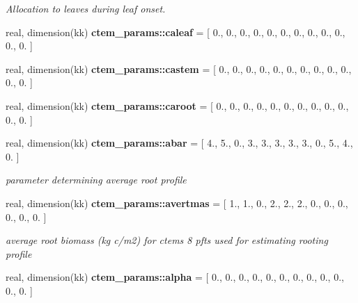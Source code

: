 \begin{DoxyCompactItemize}
\begin{DoxyCompactList}\small\item\em Allocation to leaves during leaf onset. \end{DoxyCompactList}\item 
\hypertarget{namespacectem__params_a593225b4810a8b566176f0ada4a2ad7a}{}real, dimension(kk) {\bfseries ctem\+\_\+params\+::caleaf} = \mbox{[} 0., 0., 0., 0., 0., 0., 0., 0., 0., 0., 0., 0. \mbox{]}\label{namespacectem__params_a593225b4810a8b566176f0ada4a2ad7a}

\item 
\hypertarget{namespacectem__params_aa2fad05936bda6d7d58531f2a19d1b7b}{}real, dimension(kk) {\bfseries ctem\+\_\+params\+::castem} = \mbox{[} 0., 0., 0., 0., 0., 0., 0., 0., 0., 0., 0., 0. \mbox{]}\label{namespacectem__params_aa2fad05936bda6d7d58531f2a19d1b7b}

\item 
\hypertarget{namespacectem__params_a80eaaf9535291c9113cb1014eea91ca6}{}real, dimension(kk) {\bfseries ctem\+\_\+params\+::caroot} = \mbox{[} 0., 0., 0., 0., 0., 0., 0., 0., 0., 0., 0., 0. \mbox{]}\label{namespacectem__params_a80eaaf9535291c9113cb1014eea91ca6}

\item 
\hypertarget{namespacectem__params_a80132ab7ebb5d63e27978d1a13df0b80}{}real, dimension(kk) {\bfseries ctem\+\_\+params\+::abar} = \mbox{[} 4., 5., 0., 3., 3., 3., 3., 3., 0., 5., 4., 0. \mbox{]}\label{namespacectem__params_a80132ab7ebb5d63e27978d1a13df0b80}

\begin{DoxyCompactList}\small\item\em parameter determining average root profile \end{DoxyCompactList}\item 
\hypertarget{namespacectem__params_ad1f59f53c14c2a0c09bfad6b11139bca}{}real, dimension(kk) {\bfseries ctem\+\_\+params\+::avertmas} = \mbox{[} 1., 1., 0., 2., 2., 2., 0., 0., 0., 0., 0., 0. \mbox{]}\label{namespacectem__params_ad1f59f53c14c2a0c09bfad6b11139bca}

\begin{DoxyCompactList}\small\item\em average root biomass (kg c/m2) for ctem\textquotesingle{}s 8 pfts used for estimating rooting profile \end{DoxyCompactList}\item 
\hypertarget{namespacectem__params_aafa01f9ec060f116fdd559e2f9c8b32e}{}real, dimension(kk) {\bfseries ctem\+\_\+params\+::alpha} = \mbox{[} 0., 0., 0., 0., 0., 0., 0., 0., 0., 0., 0., 0. \mbox{]}\label{namespacectem__params_aafa01f9ec060f116fdd559e2f9c8b32e}


\end{DoxyCompactItemize}
